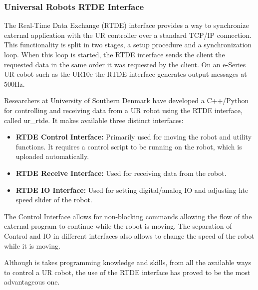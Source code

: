 
\subsubsection{Universal Robots RTDE Interface}


\par The Real-Time Data Exchange (RTDE) interface provides a way to synchronize external application with the UR controller over a standard TCP/IP connection. This functionality is split in two stages, a setup procedure and a synchronization loop. When this loop is started, the RTDE interface sends the client the requested data in the same order it was requested by the client. On an e-Series UR cobot such as the UR10e the RTDE interface generates output messages at 500Hz. 
\par Researchers at University of Southern Denmark have developed a C++/Python for controlling and receiving data from a UR robot using the RTDE interface, called ur\_rtde. It makes available three distinct interfaces: 

\begin{itemize}
    \item \textbf{RTDE Control Interface: }Primarily used for moving the robot and utility functions. It requires a control script to be running on the robot, which is uploaded automatically.
    \item \textbf{RTDE Receive Interface: }Used for receiving data from the robot.
    \item \textbf{RTDE IO Interface: }Used for setting digital/analog IO and adjusting hte speed slider of the robot.
\end{itemize}

\noindent The Control Interface allows for non-blocking commands allowing the flow of the external program to continue while the robot is moving. The separation of Control and IO in different interfaces also allows to change the speed of the robot while it is moving. 
\par Although is takes programming knowledge and skills, from all the available ways to control a UR cobot, the use of the RTDE interface has proved to be the most advantageous one.


